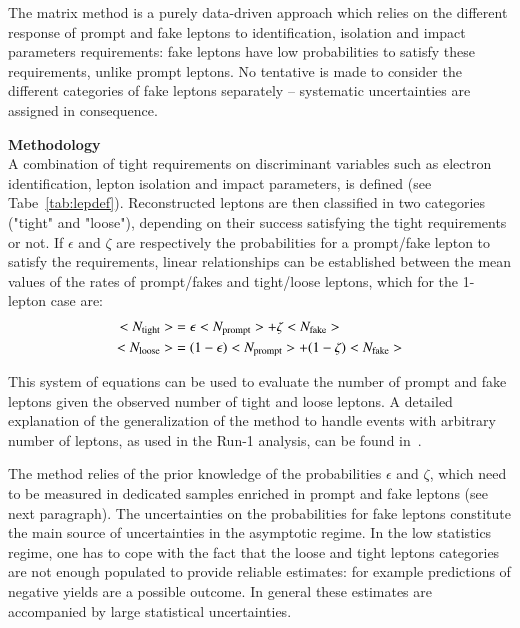 The matrix method is a purely data-driven approach 
which relies on the different response of prompt and fake leptons to identification, isolation and impact parameters requirements: 
fake leptons have low probabilities to satisfy these requirements, unlike prompt leptons. 
No tentative is made to consider the different categories of fake leptons separately -- systematic uncertainties are assigned in consequence. 
\\
\par{\bf Methodology\\}
A combination of tight requirements on discriminant variables such as electron identification, lepton isolation and impact parameters, is defined (see Tabe~\ref{tab:lepdef}). 
Reconstructed leptons are then classified in two categories ("tight" and "loose"), depending on their success satisfying the tight requirements or not. 
If $\epsilon$ and $\zeta$ are respectively the probabilities for a prompt/fake lepton to satisfy the requirements, 
linear relationships can be established between the mean values of the rates of prompt/fakes and tight/loose leptons, which for the 1-lepton case are: 
\begin{align}
\label{eqn:matrixmethod}
<N_\text{tight}> &= \epsilon <N_\text{prompt}> + \zeta <N_\text{fake}> \\\notag
<N_\text{loose}> &=  (1-\epsilon) <N_\text{prompt}> + (1-\zeta) <N_\text{fake}>
\end{align}

This system of equations can be used to evaluate the number of prompt and fake leptons given the observed number of tight and loose leptons. 
A detailed explanation of the generalization of the method to handle events with arbitrary number of leptons, as used in the Run-1 analysis, 
can be found in~\cite{noteSS3L,TomThesis}. 

The method relies of the prior knowledge of the probabilities $\epsilon$ and $\zeta$, 
which need to be measured in dedicated samples enriched in prompt and fake leptons (see next paragraph). 
The uncertainties on the probabilities for fake leptons constitute the main source of uncertainties in the asymptotic regime. 
In the low statistics regime, one has to cope with the fact that the loose and tight leptons categories are not enough populated 
to provide reliable estimates: 
for example predictions of negative yields are a possible outcome. 
In general these estimates are accompanied by large statistical uncertainties. 

